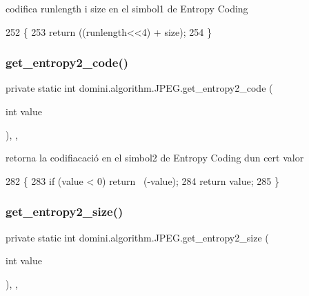 codifica runlength i size en el simbol1 de Entropy Coding 


\begin{DoxyCode}
252                                                                   \{
253         \textcolor{keywordflow}{return} ((runlength<<4) + size);
254     \}
\end{DoxyCode}
\mbox{\label{classdomini_1_1algorithm_1_1JPEG_a0ccbcda5311dc96a30e5cb7f2a5b95b5}} 
\subsubsection{\texorpdfstring{get\+\_\+entropy2\+\_\+code()}{get\_entropy2\_code()}}
{\footnotesize\ttfamily private static int domini.\+algorithm.\+J\+P\+E\+G.\+get\+\_\+entropy2\+\_\+code (\begin{DoxyParamCaption}\item[{int}]{value }\end{DoxyParamCaption})\hspace{0.3cm}{\ttfamily [inline]}, {\ttfamily [static]}, {\ttfamily [private]}}



retorna la codifiacació en el simbol2 de Entropy Coding d\textquotesingle{}un cert valor 


\begin{DoxyCode}
282                                                     \{
283         \textcolor{keywordflow}{if} (value < 0) \textcolor{keywordflow}{return} ~(-value);
284         \textcolor{keywordflow}{return} value;
285     \}
\end{DoxyCode}
\mbox{\label{classdomini_1_1algorithm_1_1JPEG_aa9bc9bee7181efee254be843e23ee2c6}} 
\subsubsection{\texorpdfstring{get\+\_\+entropy2\+\_\+size()}{get\_entropy2\_size()}}
{\footnotesize\ttfamily private static int domini.\+algorithm.\+J\+P\+E\+G.\+get\+\_\+entropy2\+\_\+size (\begin{DoxyParamCaption}\item[{int}]{value }\end{DoxyParamCaption})\hspace{0.3cm}{\ttfamily [inline]}, {\ttfamily [static]}, {\ttfamily [private]}}




